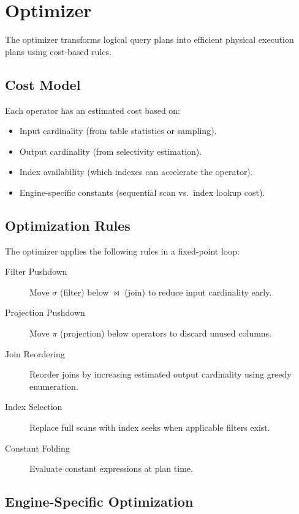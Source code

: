 \section{Optimizer}
\label{sec:optimizer}

The optimizer transforms logical query plans into efficient physical
execution plans using cost-based rules.

\subsection{Cost Model}
\label{sec:optimizer:cost}

Each operator has an estimated cost based on:
\begin{itemize}
    \item Input cardinality (from table statistics or sampling).
    \item Output cardinality (from selectivity estimation).
    \item Index availability (which indexes can accelerate the operator).
    \item Engine-specific constants (sequential scan vs.\ index lookup cost).
\end{itemize}

\subsection{Optimization Rules}
\label{sec:optimizer:rules}

The optimizer applies the following rules in a fixed-point loop:

\begin{description}
    \item[Filter Pushdown] Move $\sigma$ (filter) below $\bowtie$ (join)
          to reduce input cardinality early.
    \item[Projection Pushdown] Move $\pi$ (projection) below operators to
          discard unused columns.
    \item[Join Reordering] Reorder joins by increasing estimated output
          cardinality using greedy enumeration.
    \item[Index Selection] Replace full scans with index seeks when
          applicable filters exist.
    \item[Constant Folding] Evaluate constant expressions at plan time.
\end{description}

\subsection{Engine-Specific Optimization}
\label{sec:optimizer:engine}

